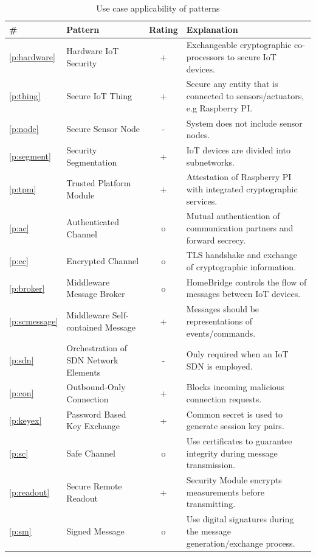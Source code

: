 \begin{landscape}
\begin{longtable}[c]{llcp{12cm}}
	\caption{Use case applicability of patterns}
	\label{tab:use-case} \\
	\hline
	\textbf{\#} & \textbf{Pattern} & \textbf{Rating} &
	\textbf{Explanation} \\
	\hline
	\endhead
	\ref{p:hardware} & Hardware IoT Security & + & Exchangeable cryptographic co-processors to secure IoT devices. \\
	\ref{p:thing} & Secure IoT Thing & + & Secure any entity that is connected to sensors/actuators, e.g Raspberry PI. \\
	\ref{p:node} & Secure Sensor Node & - & System does not include sensor nodes. \\
	\ref{p:segment} & Security Segmentation & + & IoT devices are divided into subnetworks. \\
	\ref{p:tpm} & Trusted Platform Module & + & Attestation of Raspberry PI with integrated cryptographic services. \\
	\hline
	\ref{p:ac} & Authenticated Channel & o & Mutual authentication of communication partners and forward secrecy. \\
	\ref{p:ec} & Encrypted Channel & o & TLS handshake and exchange of cryptographic information. \\
	\ref{p:broker} & Middleware Message Broker & o & HomeBridge controls the flow of messages between IoT devices. \\
	\ref{p:scmessage} & Middleware Self-contained Message & + & Messages should be \q{pure and complete} representations of events/commands. \\
	\ref{p:sdn} & Orchestration of SDN Network Elements & - & Only required when an IoT SDN is employed. \\
	\ref{p:con} & Outbound-Only Connection & + & Blocks incoming malicious connection requests. \\
	\ref{p:keyex} & Password Based Key Exchange & + & Common secret is used to generate session key pairs. \\
	\ref{p:sc} & Safe Channel & o & Use certificates to guarantee integrity during message transmission. \\
	\ref{p:readout} & Secure Remote Readout & + & Security Module encrypts measurements before transmitting. \\
	\ref{p:sm} & Signed Message & o & Use digital signatures during the message generation/exchange process. \\

\end{longtable}
\end{landscape}
